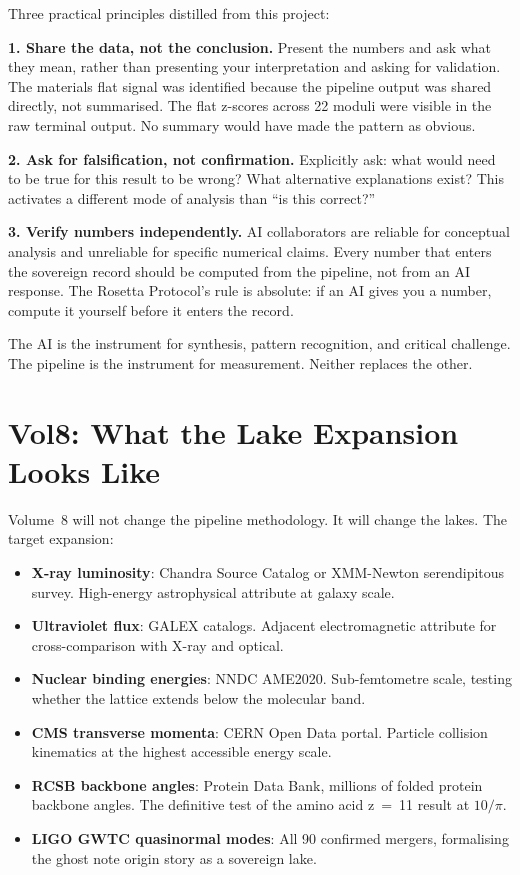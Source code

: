 \documentclass[11pt, letterpaper, openany]{book}
\begin{document}
Three practical principles distilled from this project:

\textbf{1. Share the data, not the conclusion.} Present the numbers and ask what
they mean, rather than presenting your interpretation and asking for validation.
The materials flat signal was identified because the pipeline output was shared
directly, not summarised. The flat z-scores across 22 moduli were visible in the
raw terminal output. No summary would have made the pattern as obvious.

\textbf{2. Ask for falsification, not confirmation.} Explicitly ask: what would need
to be true for this result to be wrong? What alternative explanations exist? This
activates a different mode of analysis than ``is this correct?''

\textbf{3. Verify numbers independently.} AI collaborators are reliable for
conceptual analysis and unreliable for specific numerical claims. Every number that
enters the sovereign record should be computed from the pipeline, not from an AI
response. The Rosetta Protocol's rule is absolute: if an AI gives you a number, 
compute it yourself before it enters the record.

The AI is the instrument for synthesis, pattern recognition, and critical challenge.
The pipeline is the instrument for measurement. Neither replaces the other.

\section*{Vol8: What the Lake Expansion Looks Like}

Volume~8 will not change the pipeline methodology. It will change the lakes. The
target expansion:

\begin{itemize}
\item \textbf{X-ray luminosity}: Chandra Source Catalog or XMM-Newton serendipitous
      survey. High-energy astrophysical attribute at galaxy scale.
\item \textbf{Ultraviolet flux}: GALEX catalogs. Adjacent electromagnetic attribute
      for cross-comparison with X-ray and optical.
\item \textbf{Nuclear binding energies}: NNDC AME2020. Sub-femtometre scale,
      testing whether the lattice extends below the molecular band.
\item \textbf{CMS transverse momenta}: CERN Open Data portal. Particle collision
      kinematics at the highest accessible energy scale.
\item \textbf{RCSB backbone angles}: Protein Data Bank, millions of folded protein
      backbone angles. The definitive test of the amino acid z~=~11 result at $10/\pi$.
\item \textbf{LIGO GWTC quasinormal modes}: All 90 confirmed mergers, formalising
      the ghost note origin story as a sovereign lake.
\end{itemize}
\end{document}
